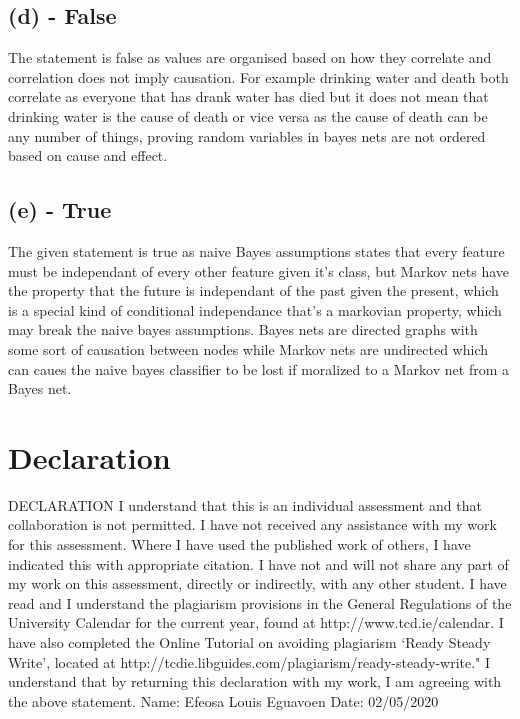 \documentclass[11pt]{article} %
\begin{document}
\subsection{(d) - False}
The statement is false as values are organised based on how they correlate and correlation does not imply causation. For example drinking water and death both correlate as everyone that has drank water has died but it does not mean that drinking water is the cause of death or vice versa as the cause of death can be any number of things, proving random variables in bayes nets are not ordered based on cause and effect.

\subsection{(e) - True}
The given statement is true as naive Bayes assumptions states that every feature must be independant of every other feature given it's class, but Markov nets have the property that the future is independant of the past given the present, which is a special kind of conditional independance that's a markovian property, which may break the naive bayes assumptions. Bayes nets are directed graphs with some sort of causation between nodes while Markov nets are undirected which can caues the naive bayes classifier to be lost if moralized to a Markov net from a Bayes net.
\section{Declaration}
DECLARATION 
 \newline
 \newline
I understand that this is an individual assessment and that collaboration is not permitted. I have not received any assistance with my work for this assessment. Where I have used the published work of others, I have indicated this with appropriate citation. 
 \newline
 \newline
I have not and will not share any part of my work on this assessment, directly or indirectly, with any other student. 
 \newline
 \newline
I have read and I understand the plagiarism provisions in the General Regulations of the University Calendar for the current year, found at http://www.tcd.ie/calendar. 
 \newline
 \newline
I have also completed the Online Tutorial on avoiding plagiarism ‘Ready Steady Write’, located at http://tcdie.libguides.com/plagiarism/ready-steady-write." 
 \newline
 \newline
I understand that by returning this declaration with my work, I am agreeing with the above statement. 
 \newline
 \newline
Name: Efeosa Louis Eguavoen	
 \newline
Date:  02/05/2020
\end{document}
